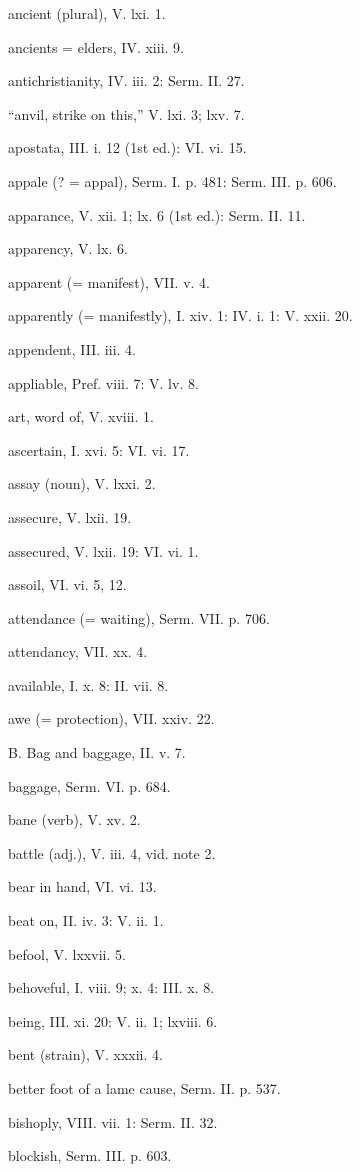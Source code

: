 ancient (plural), V. lxi. 1.

ancients = elders, IV. xiii. 9.

antichristianity, IV. iii. 2: Serm. II. 27.

“anvil, strike on this,” V. lxi. 3; lxv. 7.

apostata, III. i. 12 (1st ed.): VI. vi. 15.

appale (? = appal), Serm. I. p. 481: Serm. III. p. 606.

apparance, V. xii. 1; lx. 6 (1st ed.): Serm. II. 11.

apparency, V. lx. 6.

apparent (= manifest), VII. v. 4.

apparently (= manifestly), I. xiv. 1: IV. i. 1: V. xxii. 20.

appendent, III. iii. 4.

appliable, Pref. viii. 7: V. lv. 8.

art, word of, V. xviii. 1.

ascertain, I. xvi. 5: VI. vi. 17.

assay (noun), V. lxxi. 2.

assecure, V. lxii. 19.

assecured, V. lxii. 19: VI. vi. 1.

assoil, VI. vi. 5, 12.

attendance (= waiting), Serm. VII. p. 706.

attendancy, VII. xx. 4.

available, I. x. 8: II. vii. 8.

awe (= protection), VII. xxiv. 22.

B.
Bag and baggage, II. v. 7.

baggage, Serm. VI. p. 684.

bane (verb), V. xv. 2.

battle (adj.), V. iii. 4, vid. note 2.

bear in hand, VI. vi. 13.

beat on, II. iv. 3: V. ii. 1.

befool, V. lxxvii. 5.

behoveful, I. viii. 9; x. 4: III. x. 8.

being, III. xi. 20: V. ii. 1; lxviii. 6.

bent (strain), V. xxxii. 4.

better foot of a lame cause, Serm. II. p. 537.

bishoply, VIII. vii. 1: Serm. II. 32.

blockish, Serm. III. p. 603.

